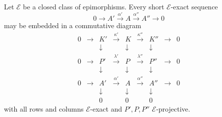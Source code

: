 Let $\mathcal{E}$ be a closed class of epimorphisms. Every short $\mathcal{E}$-exact sequence
$$0 \rightarrow A' \xrightarrow{\alpha'} A \xrightarrow{\alpha''} A'' \rightarrow 0$$
may be embedded in a commutative diagram
$$
\begin{array}{ccccccccc}
0 & \rightarrow & K' & \xrightarrow{\kappa'} & K & \xrightarrow{\kappa''} & K'' & \rightarrow & 0 \\
& & \downarrow & & \downarrow & & \downarrow & & \\
0 & \rightarrow & P' & \xrightarrow{\lambda'} & P & \xrightarrow{\lambda''} & P'' & \rightarrow & 0 \\
& & \downarrow & & \downarrow & & \downarrow & & \\
0 & \rightarrow & A' & \xrightarrow{\alpha'} & A & \xrightarrow{\alpha''} & A'' & \rightarrow & 0 \\
& & \downarrow & & \downarrow & & \downarrow & & \\
& & 0 & & 0 & & 0 & &
\end{array}
$$
with all rows and columns $\mathcal{E}$-exact and $P', P, P''$ $\mathcal{E}$-projective.
